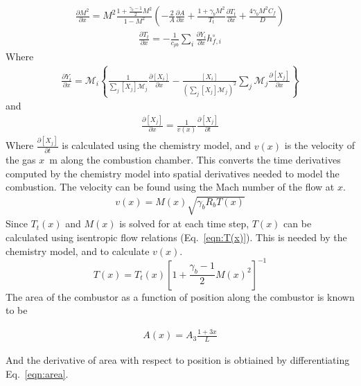 \documentclass[a4paper]{article}
\begin{document}
\begin{align}\label{eqn:dM2dx}
    \frac{\partial M^2}{\partial x} =M^2 \frac{1 + \frac{\gamma_b - 1}{2}M^2}{1-M^2}\left( -\frac{2}{A} \frac{\partial A}{\partial x} + \frac{1 + \gamma_b M^2}{T_t}\frac{\partial T_t}{\partial x} + \frac{4 \gamma_b M^2 C_f}{D}\right)
\end{align}
\begin{align}\label{eqn:dTtdx}
    \frac{\partial T_t}{\partial x} = - \frac{1}{c_{pb}}\sum_i \frac{\partial Y_i}{\partial x}h_{f,i}^\circ
\end{align}
Where
\begin{align}\label{eqn:spatial_mass_fraction_gradient}
    \frac{\partial Y_i}{\partial x} = \mathcal{M}_i \left\lbrace \frac{1}{\sum_j \left[X_j\right]\mathcal{M}_j} \frac{\partial \left[X_i\right]}{\partial x} - \frac{\left[ X_i \right]}{\left(\sum_j \left[X_j\right]\mathcal{M}_j \right)^2 }\sum_j \mathcal{M}_j\frac{\partial \left[ X_j \right]}{\partial x} \right\rbrace
\end{align}
and 
\begin{align}\label{eqn:spatial_concentratoin_gradient}
    \frac{\partial \left[X_j\right]}{\partial x} = \frac{1}{v(x)}\frac{\partial \left[X_j\right]}{\partial t}
\end{align}
Where \(\frac{\partial \left[X_j\right]}{\partial t}\) is calculated using the chemistry model, and \(v(x)\) is the velocity of the gas \(x\)~m along the combustion chamber. This converts the time derivatives computed by the chemistry model into spatial derivatives needed to model the combustion. The velocity can be found using the Mach number of the flow at \(x\).
\begin{align}\label{eqn:v(x)}
    v(x) = M(x) \sqrt{\gamma_b R_b T(x)}
\end{align}
Since \(T_t(x)\) and \(M(x)\) is solved for at each time step, \(T(x)\) can be calculated using isentropic flow relations (Eq.~\ref{eqn:T(x)}). This is needed by the chemistry model, and to calculate \(v(x)\).
\begin{equation}\label{eqn:T(x)}
    T(x) = T_t(x) \left[ 1 + \frac{\gamma_b  - 1}{2}M(x)^2 \right]^{-1}
\end{equation}
The area of the combustor as a function of position along the combustor is known to be 

\begin{align} \label{eqn:area}
    A(x) = A_3 \frac{1 + 3x}{L}
\end{align}

And the derivative of area with respect to position is obtiained by differentiating Eq.~\ref{eqn:area}.
\end{document}
